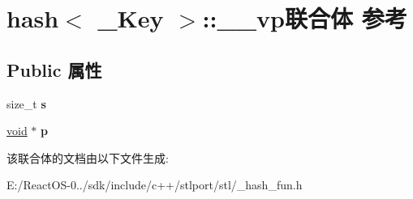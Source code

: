 \hypertarget{unionhash_3_01void_01_5_01_4_1_1____vp}{}\section{hash$<$ \+\_\+\+Key $>$\+:\+:\+\_\+\+\_\+vp联合体 参考}
\label{unionhash_3_01void_01_5_01_4_1_1____vp}
\subsection*{Public 属性}
\begin{DoxyCompactItemize}
\item 
\mbox{\label{unionhash_3_01void_01_5_01_4_1_1____vp_a57e57cdf704101273cc0b178b50bb07b}} 
size\+\_\+t {\bfseries s}
\item 
\mbox{\label{unionhash_3_01void_01_5_01_4_1_1____vp_a35ec62fd65f2d418d9aeab9859a496b4}} 
\hyperlink{interfacevoid}{void} $\ast$ {\bfseries p}
\end{DoxyCompactItemize}


该联合体的文档由以下文件生成\+:\begin{DoxyCompactItemize}
\item 
E\+:/\+React\+O\+S-\/0../sdk/include/c++/stlport/stl/\+\_\+hash\+\_\+fun.\+h\end{DoxyCompactItemize}
